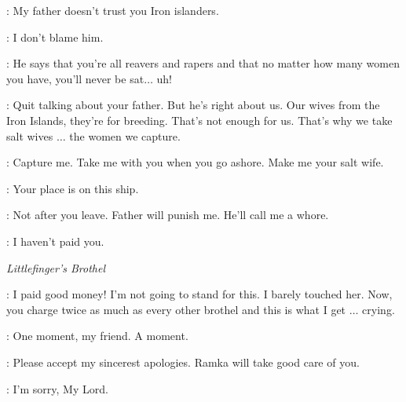 
\WOMAN: My father doesn't trust you Iron islanders.

\THEON: I don't blame him.

\WOMAN: He says that you're all reavers and rapers and that no matter how many women you have, you'll never be sat$\ldots$ uh!


\THEON: Quit talking about your father. But he's right about us. Our wives from the Iron Islands, they're for breeding. That's not enough for us. That's why we take salt wives $\ldots$ the women we capture.

\WOMAN: Capture me. Take me with you when you go ashore. Make me your salt wife.

\THEON: Your place is on this ship.

\WOMAN: Not after you leave. Father will punish me. He'll call me a whore.

\THEON: I haven't paid you.



\scene

\textit{Littlefinger's Brothel}


\CLIENT: I paid good money! I'm not going to stand for this. I barely touched her. Now, you charge twice as much as every other brothel and this is what I get $\ldots$ crying.

\LITTLEFINGER: One moment, my friend. A moment.


\LITTLEFINGER: Please accept my sincerest apologies. Ramka will take good care of you.


\ROS: I'm sorry, My Lord.

